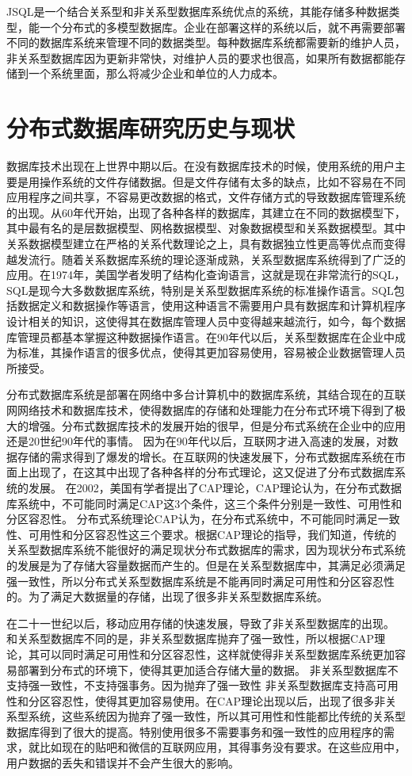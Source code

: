 	JSQL是一个结合关系型和非关系型数据库系统优点的系统，其能存储多种数据类型，能一个分布式的多模型数据库。企业在部署这样的系统以后，就不再需要部署不同的数据库系统来管理不同的数据类型。每种数据库系统都需要新的维护人员，非关系型数据库因为更新非常快，对维护人员的要求也很高，如果所有数据都能存储到一个系统里面，那么将减少企业和单位的人力成本。
\section{分布式数据库研究历史与现状}
数据库技术出现在上世界中期以后。在没有数据库技术的时候，使用系统的用户主要是用操作系统的文件存储数据。但是文件存储有太多的缺点，比如不容易在不同应用程序之间共享，不容易更改数据的格式，文件存储方式的导致数据库管理系统的出现。从60年代开始，出现了各种各样的数据库，其建立在不同的数据模型下，其中最有名的是层数据模型、网格数据模型、对象数据模型和关系数据模型。其中关系数据模型建立在严格的关系代数理论之上，具有数据独立性更高等优点而变得越发流行。随着关系数据库系统的理论逐渐成熟，关系型数据库系统得到了广泛的应用。在1974年，美国学者发明了结构化查询语言，这就是现在非常流行的SQL，SQL是现今大多数数据库系统，特别是关系型数据库系统的标准操作语言。SQL包括数据定义和数据操作等语言，使用这种语言不需要用户具有数据库和计算机程序设计相关的知识，这使得其在数据库管理人员中变得越来越流行，如今，每个数据库管理员都基本掌握这种数据操作语言。在90年代以后，关系型数据库在企业中成为标准，其操作语言的很多优点，使得其更加容易使用，容易被企业数据管理人员所接受。

分布式数据库系统是部署在网络中多台计算机中的数据库系统，其结合现在的互联网网络技术和数据库技术，使得数据库的存储和处理能力在分布式环境下得到了极大的增强。分布式数据库技术的发展开始的很早，但是分布式系统在企业中的应用还是20世纪90年代的事情。
因为在90年代以后，互联网才进入高速的发展，对数据存储的需求得到了爆发的增长。在互联网的快速发展下，分布式数据库系统在市面上出现了，在这其中出现了各种各样的分布式理论，这又促进了分布式数据库系统的发展。 在2002，美国有学者提出了CAP理论，CAP理论认为，在分布式数据库系统中，不可能同时满足CAP这3个条件，这三个条件分别是一致性、可用性和分区容忍性。 分布式系统理论CAP认为，在分布式系统中，不可能同时满足一致性、可用性和分区容忍性这三个要求。根据CAP理论的指导，我们知道，传统的关系型数据库系统不能很好的满足现状分布式数据库的需求，因为现状分布式系统的发展是为了存储大容量数据而产生的。但是在关系型数据库中，其满足必须满足强一致性，所以分布式关系型数据库系统是不能再同时满足可用性和分区容忍性的。为了满足大数据量的存储，出现了很多非关系型数据库系统。

在二十一世纪以后，移动应用存储的快速发展，导致了非关系型数据库的出现。
和关系型数据库不同的是，非关系型数据库抛弃了强一致性，所以根据CAP理论，其可以同时满足可用性和分区容忍性，这样就使得非关系型数据库系统更加容易部署到分布式的环境下，使得其更加适合存储大量的数据。 非关系型数据库不支持强一致性，不支持强事务。因为抛弃了强一致性
非关系型数据库支持高可用性和分区容忍性，使得其更加容易使用。在CAP理论出现以后，出现了很多非关系型系统，这些系统因为抛弃了强一致性，所以其可用性和性能都比传统的关系型数据库得到了很大的提高。特别使用很多不需要事务和强一致性的应用程序的需求，就比如现在的贴吧和微信的互联网应用，其得事务没有要求。在这些应用中，用户数据的丢失和错误并不会产生很大的影响。



